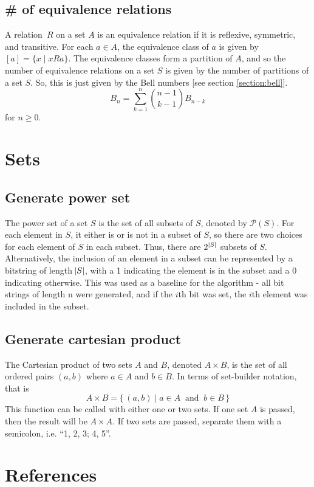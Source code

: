 \documentclass{article}
\begin{document}
\subsection{\# of equivalence relations}
A relation $R$ on a set $A$ is an equivalence relation if it is reflexive, symmetric, and transitive. For each $a \in A$, the equivalence class of $a$ is given by $[a] = \{x \mid xRa\}$. The equivalence classes form a partition of $A$, and so the number of equivalence relations on a set $S$ is given by the number of partitions of a set $S$. So, this is just given by the Bell numbers [see section \ref{section:bell}].
\[B_n = \sum_{k=1}^{n} {n-1 \choose k-1} B_{n-k}\]
for $n \ge 0$.

\newpage
\section{Sets}
\subsection{Generate power set}
The power set of a set $S$ is the set of all subsets of $S$, denoted by $\mathcal P(S)$. For each element in $S$, it either is or is not in a subset of $S$, so there are two choices for each element of $S$ in each subset. Thus, there are $2^{\,\abs{S}}$ subsets of $S$. Alternatively, the inclusion of an element in a subset can be represented by a bitstring of length $\abs{S}$, with a 1 indicating the element is in the subset and a 0 indicating otherwise. This was used as a baseline for the algorithm - all bit strings of length n were generated, and if the $i$th bit was set, the $i$th element was included in the subset.

\subsection{Generate cartesian product}
The Cartesian product of two sets $A$ and $B$, denoted $A \times B$, is the set of all ordered pairs $(a, b)$ where $a \in A$ and $b \in B$. In terms of set-builder notation, that is
\[A\times B=\{\,(a,b)\mid a\in A\ {\mbox{ and }}\ b\in B\,\}\]
This function can be called with either one or two sets. If one set $A$ is passed, then the result will be $A \times A$. If two sets are passed, separate them with a semicolon, i.e. ``1, 2, 3; 4, 5''.

\section{References}



\end{document}
